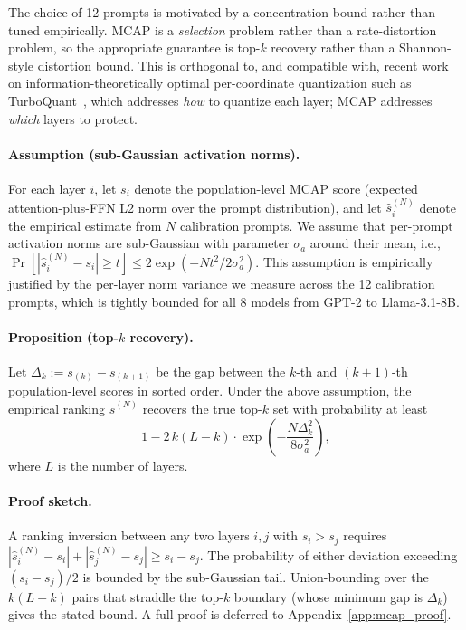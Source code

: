 \documentclass{article}
\begin{document}
The choice of 12 prompts is motivated by a concentration bound rather than
tuned empirically. MCAP is a \emph{selection} problem rather than a
rate-distortion problem, so the appropriate guarantee is top-$k$ recovery
rather than a Shannon-style distortion bound. This is orthogonal to, and
compatible with, recent work on information-theoretically optimal
per-coordinate quantization such as TurboQuant~\cite{zandieh2025turboquant},
which addresses \emph{how} to quantize each layer; MCAP addresses \emph{which}
layers to protect.

\paragraph{Assumption (sub-Gaussian activation norms).} For each layer $i$, let $s_i$
denote the population-level MCAP score (expected attention-plus-FFN L2 norm over the
prompt distribution), and let $\hat{s}_i^{(N)}$ denote the empirical estimate from $N$
calibration prompts. We assume that per-prompt activation norms are sub-Gaussian with
parameter $\sigma_a$ around their mean, i.e.,
$\Pr[|\hat{s}_i^{(N)} - s_i| \geq t] \leq 2\exp(-Nt^2 / 2\sigma_a^2)$. This assumption is
empirically justified by the per-layer norm variance we measure across the 12 calibration
prompts, which is tightly bounded for all 8 models from GPT-2 to Llama-3.1-8B.

\paragraph{Proposition (top-$k$ recovery).} Let $\Delta_k := s_{(k)} - s_{(k+1)}$ be the
gap between the $k$-th and $(k{+}1)$-th population-level scores in sorted order. Under the
above assumption, the empirical ranking $\hat{s}^{(N)}$ recovers the true top-$k$ set with
probability at least
\[
  1 - 2\,k(L-k) \cdot \exp\!\left(-\frac{N \Delta_k^2}{8 \sigma_a^2}\right),
\]
where $L$ is the number of layers.

\paragraph{Proof sketch.} A ranking inversion between any two layers $i, j$ with
$s_i > s_j$ requires $|\hat{s}_i^{(N)} - s_i| + |\hat{s}_j^{(N)} - s_j| \geq s_i - s_j$.
The probability of either deviation exceeding $(s_i - s_j)/2$ is bounded by the
sub-Gaussian tail. Union-bounding over the $k(L-k)$ pairs that straddle the top-$k$
boundary (whose minimum gap is $\Delta_k$) gives the stated bound. A full proof is
deferred to Appendix~\ref{app:mcap_proof}.
\end{document}
